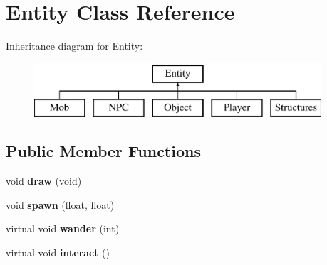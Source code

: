 \hypertarget{classEntity}{}\section{Entity Class Reference}
\label{classEntity}
Inheritance diagram for Entity\+:\begin{figure}[H]
\begin{center}
\leavevmode
\includegraphics[height=2.000000cm]{classEntity}
\end{center}
\end{figure}
\subsection*{Public Member Functions}
\begin{DoxyCompactItemize}
\item 
\hypertarget{classEntity_a1ea7af40bd2d22c3ccffffb9d75449f1}{}void {\bfseries draw} (void)\label{classEntity_a1ea7af40bd2d22c3ccffffb9d75449f1}

\item 
\hypertarget{classEntity_a395847a44327233974bdb6c546412f72}{}void {\bfseries spawn} (float, float)\label{classEntity_a395847a44327233974bdb6c546412f72}

\item 
\hypertarget{classEntity_a9cda23bb400ce86af59f673065e8be6e}{}virtual void {\bfseries wander} (int)\label{classEntity_a9cda23bb400ce86af59f673065e8be6e}

\item 
\hypertarget{classEntity_aad35d2bfa6b5f2af9c433177b455f20b}{}virtual void {\bfseries interact} ()\label{classEntity_aad35d2bfa6b5f2af9c433177b455f20b}

\end{DoxyCompactItemize}
